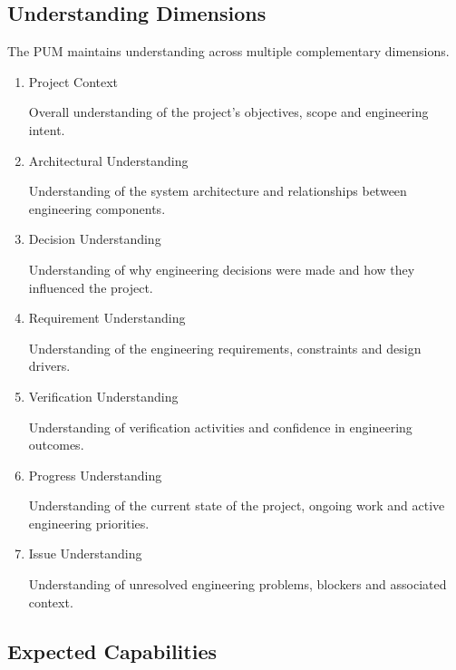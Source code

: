 
\subsection{Understanding Dimensions}

The PUM maintains understanding across multiple complementary dimensions.

\begin{enumerate}

\item Project Context

Overall understanding of the project's objectives, scope and engineering intent.

\item Architectural Understanding

Understanding of the system architecture and relationships between engineering components.

\item Decision Understanding

Understanding of why engineering decisions were made and how they influenced the project.

\item Requirement Understanding

Understanding of the engineering requirements, constraints and design drivers.

\item Verification Understanding

Understanding of verification activities and confidence in engineering outcomes.

\item Progress Understanding

Understanding of the current state of the project, ongoing work and active engineering priorities.

\item Issue Understanding

Understanding of unresolved engineering problems, blockers and associated context.

\end{enumerate}


\subsection{Expected Capabilities}

